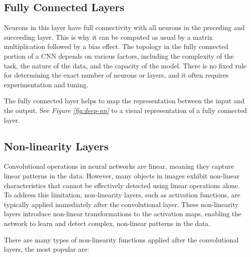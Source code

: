 \subsection{Fully Connected Layers}

Neurons in this layer have full connectivity with all neurons in the preceding
and succeeding layer. This is why it can be computed as usual by a matrix
multiplication followed by a bias effect. The topology in the fully connected
portion of a CNN depends on various factors, including the complexity of the
task, the nature of the data, and the capacity of the model. There is no fixed
rule for determining the exact number of neurons or layers, and it often
requires experimentation and tuning. \newline

The fully connected layer helps to map the representation between the input and
the output. See \textit{Figure \ref{fig:deep-nn}} to a visual representation of
a fully connected layer. \newline

\subsection{Non-linearity Layers}

Convolutional operations in neural networks are linear, meaning they capture
linear patterns in the data. However, many objects in images exhibit non-linear
characteristics that cannot be effectively detected using linear operations
alone. To address this limitation, non-linearity layers, such as activation
functions, are typically applied immediately after the convolutional layer.
These non-linearity layers introduce non-linear transformations to the
activation maps, enabling the network to learn and detect complex, non-linear
patterns in the data. \newline

There are many types of non-linearity functions applied after the convolutional
layers, the most popular are: \newline


